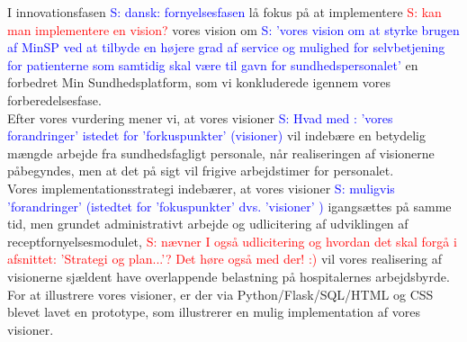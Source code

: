 I innovationsfasen 
\textcolor{blue}{S: dansk: fornyelsesfasen} lå fokus på at implementere 
\textcolor{red}{S: kan man implementere en vision? } 
vores vision om 
\textcolor{blue}{S: 'vores vision om at styrke brugen af MinSP ved at tilbyde en højere grad af service og mulighed for selvbetjening for patienterne som samtidig skal være til gavn for sundhedspersonalet'}
en forbedret Min Sundhedsplatform, som vi konkluderede igennem vores forberedelsesfase.\\
Efter vores vurdering mener vi, at vores visioner 
\textcolor{blue}{S: Hvad med : 'vores forandringer' istedet for 'forkuspunkter' (visioner)}
 vil indebære en betydelig mængde arbejde fra sundhedsfagligt personale, når realiseringen af visionerne påbegyndes, men at det på sigt vil frigive arbejdstimer for personalet.\\
Vores implementationsstrategi indebærer, at vores visioner 
\textcolor{blue}{S: muligvis 'forandringer' (istedtet for 'fokuspunkter' dvs. 'visioner' )}
 igangsættes på samme tid, men grundet administrativt arbejde og udlicitering af udviklingen af receptfornyelsesmodulet,
 \textcolor{red}{S: nævner I også udlicitering og hvordan det skal forgå i afsnittet: 'Strategi og plan...'? Det høre også med der! :)} 
 vil vores realisering af visionerne sjældent have overlappende belastning på hospitalernes arbejdsbyrde.\\
For at illustrere vores visioner, er der via Python/Flask/SQL/HTML og CSS blevet lavet en prototype, som illustrerer en mulig implementation af vores visioner.\\
